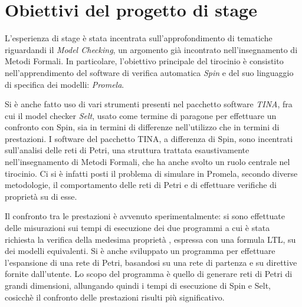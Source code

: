 \section{Obiettivi del progetto di stage}
L'esperienza di stage è stata incentrata sull'approfondimento di tematiche 
riguardandi il \emph{Model Checking}, un argomento già incontrato
nell'insegnamento di Metodi
Formali. In particolare, l'obiettivo principale del tirocinio è consistito 
nell'apprendimento del software di verifica automatica \emph{Spin}
e del suo linguaggio di specifica dei modelli: \emph{Promela}.

Si è anche fatto uso di vari strumenti presenti nel pacchetto software
\emph{TINA}, fra cui il model checker \emph{Selt}, usato come termine di
paragone per effettuare un confronto con Spin, sia in termini di differenze 
nell'utilizzo che in termini di prestazioni.
I software del pacchetto TINA, a differenza di Spin, sono incentrati
sull'analisi delle reti di Petri, una struttura trattata esaustivamente
nell'insegnamento di Metodi Formali, che ha anche svolto un ruolo centrale
nel tirocinio.
Ci si è infatti posti il problema di simulare in Promela, secondo diverse
metodologie, il comportamento delle reti di Petri e di effettuare verifiche di
proprietà su di esse.


Il confronto tra le prestazioni è avvenuto sperimentalmente: si sono
effettuate delle misurazioni sui tempi di esecuzione dei due programmi a
cui è stata richiesta la verifica della medesima proprietà
, espressa con una formula LTL, su dei modelli equivalenti.
Si è anche sviluppato un programma per effettuare l'espansione di una rete di
Petri, basandosi su una rete di partenza e su direttive fornite dall'utente.
Lo scopo del programma è quello di generare reti di Petri di grandi
dimensioni, allungando quindi i tempi di esecuzione di Spin e Selt,
cosicchè il confronto delle prestazioni risulti più significativo.






